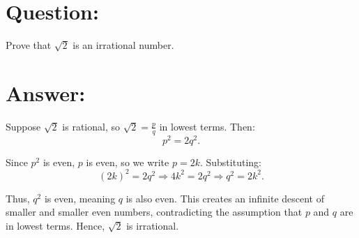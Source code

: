 \documentclass{article}
\begin{document}
\section{Question:}

Prove that $\sqrt{2}$ is an irrational number.

\section{Answer:}

Suppose $\sqrt{2}$ is rational, so $\sqrt{2} = \frac{p}{q}$ in lowest terms. Then:
\begin{equation}
    p^2 = 2q^2.
\end{equation}

Since $p^2$ is even, $p$ is even, so we write $p = 2k$. Substituting:
\begin{equation}
    (2k)^2 = 2q^2 \Rightarrow 4k^2 = 2q^2 \Rightarrow q^2 = 2k^2.
\end{equation}

Thus, $q^2$ is even, meaning $q$ is also even. This creates an infinite descent of smaller and smaller even numbers, contradicting the assumption that $p$ and $q$ are in lowest terms. Hence, $\sqrt{2}$ is irrational.
\end{document}
